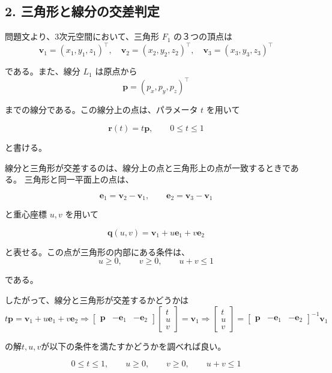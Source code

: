 \documentclass[11pt,a4paper]{ltjsarticle}
\begin{document}
\subsection*{2. 三角形と線分の交差判定}

問題文より、3次元空間において、三角形 $F_1$ の３つの頂点は
\[
\mathbf{v}_1=(x_1,y_1,z_1)^\top,\quad
\mathbf{v}_2=(x_2,y_2,z_2)^\top,\quad
\mathbf{v}_3=(x_3,y_3,z_3)^\top
\]

である。また、線分 $L_1$ は原点から
\[
\mathbf{p}=(p_x,p_y,p_z)^\top
\]

までの線分である。この線分上の点は、パラメータ $t$ を用いて

\[
\mathbf{r}(t)=t\mathbf{p},\qquad 0\leq t\leq 1
\]

と書ける。

線分と三角形が交差するのは、線分上の点と三角形上の点が一致するときである。
三角形と同一平面上の点は、

\[
\mathbf{e}_1=\mathbf{v}_2-\mathbf{v}_1,\qquad
\mathbf{e}_2=\mathbf{v}_3-\mathbf{v}_1
\]

と重心座標 $u,v$ を用いて

\[
\mathbf{q}(u,v)=\mathbf{v}_1+u\mathbf{e}_1+v\mathbf{e}_2
\]

と表せる。この点が三角形の内部にある条件は、
\[
u\geq 0,\qquad v\geq 0,\qquad u+v\leq 1
\]

である。

したがって、線分と三角形が交差するかどうかは
\[
t\mathbf{p}=\mathbf{v}_1+u\mathbf{e}_1+v\mathbf{e}_2
\Rightarrow
\begin{bmatrix}\mathbf{p} & -\mathbf{e}_1 & -\mathbf{e}_2\end{bmatrix}\begin{bmatrix}t\\u\\v\end{bmatrix}=\mathbf{v}_1 \Rightarrow \begin{bmatrix}t\\u\\v\end{bmatrix}=\begin{bmatrix}\mathbf{p} & -\mathbf{e}_1 & -\mathbf{e}_2\end{bmatrix}^{-1}\mathbf{v}_1
\]

の解$t,u,v$が以下の条件を満たすかどうかを調べれば良い。

\[
0\leq t\leq 1,\qquad u\geq 0,\qquad v\geq 0,\qquad u+v\leq 1
\]
\end{document}
